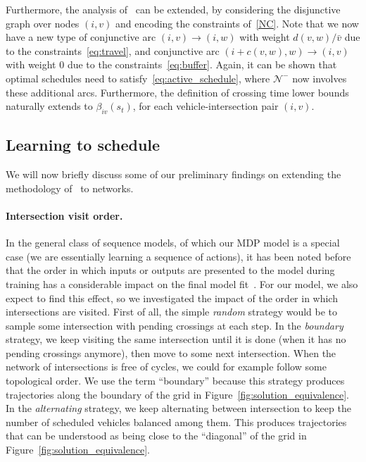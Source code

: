 \documentclass[a4paper]{report}
\theoremstyle{definition}
\theoremstyle{plain}
\begin{document}
Furthermore, the analysis of~ can be extended, by considering the disjunctive graph over nodes $(i, v)$ and encoding the constraints of~\eqref{NC}.
%
Note that we now have a new type of conjunctive arc $(i, v)  \rightarrow (i, w)$
with weight $d(v,w) /\bar{v}$ due to the constraints~\eqref{eq:travel}, and conjunctive arc
$(i + c(v,w), w) \rightarrow (i, v)$ with weight $0$ due to the
constraints~\eqref{eq:buffer}.
%
Again, it can be shown that optimal schedules need to
satisfy~\eqref{eq:active_schedule}, where $\mathcal{N}^-$ now involves these
additional arcs. Furthermore, the definition of crossing time lower bounds
naturally extends to $\beta_{iv}(s_t)$, for each vehicle-intersection pair
$(i, v)$.

\subsection{Learning to schedule}

We will now briefly discuss some of our preliminary findings on extending the
methodology of~ to networks.

\paragraph{Intersection visit order.}

In the general class of sequence models, of which our MDP model is a special
case (we are essentially learning a sequence of actions), it has been noted
before that the order in which inputs or outputs are presented to the model
during training has a considerable impact on the final model
fit~\cite{vinyalsOrderMattersSequence2016}.
%
For our model, we also expect to find this effect, so we investigated the impact
of the order in which intersections are visited.
First of all, the simple \textit{random} strategy would be to sample some
intersection with pending crossings at each step.
In the \textit{boundary} strategy, we keep visiting the same intersection until
it is done (when it has no pending crossings anymore), then move to some next
intersection. When the network of intersections is free of cycles, we could for
example follow some topological order. We use the term ``boundary'' because this
strategy produces trajectories along the boundary of the grid in
Figure~\ref{fig:solution_equivalence}.
In the \textit{alternating} strategy, we keep alternating between intersection
to keep the number of scheduled vehicles balanced among them. This produces
trajectories that can be understood as being close to the ``diagonal'' of the
grid in Figure~\ref{fig:solution_equivalence}.
\end{document}
